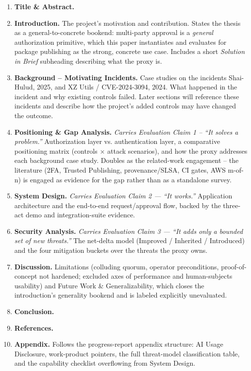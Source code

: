 \documentclass[12pt]{article}
\begin{document}
\begin{enumerate}[leftmargin=1.5em, itemsep=3pt]
  \item \textbf{Title \& Abstract.}
  \item \textbf{Introduction.} The project's motivation and contribution. States the thesis as a general-to-concrete bookend: multi-party approval is a \emph{general} authorization primitive, which this paper instantiates and evaluates for package publishing as the strong, concrete use case. Includes a short \emph{Solution in Brief} subheading describing what the proxy is.
  \item \textbf{Background -- Motivating Incidents.} Case studies on the incidents Shai-Hulud, 2025, and XZ Utils / CVE-2024-3094, 2024. What happened in the incident and why existing controls failed. Later sections will reference these incidents and describe how the project's added controls may have changed the outcome.
  \item \textbf{Positioning \& Gap Analysis.} \emph{Carries Evaluation Claim 1 -- ``It solves a problem.''} Authorization layer vs. authentication layer, a comparative positioning matrix (controls $\times$ attack scenarios), and how the proxy addresses each background case study. Doubles as the related-work engagement -- the literature (2FA, Trusted Publishing, provenance/SLSA, CI gates, AWS m-of-n) is engaged as evidence for the gap rather than as a standalone survey.
  \item \textbf{System Design.} \emph{Carries Evaluation Claim 2 — ``It works.''} Application architecture and the end-to-end request/approval flow, backed by the three-act demo and integration-suite evidence.
  \item \textbf{Security Analysis.} \emph{Carries Evaluation Claim 3 — ``It adds only a bounded set of new threats.''} The net-delta model (Improved / Inherited / Introduced) and the four mitigation buckets over the threats the proxy owns.
  \item \textbf{Discussion.} Limitations (colluding quorum, operator preconditions, proof-of-concept not hardened; excluded axes of performance and human-subjects usability) and Future Work \& Generalizability, which closes the introduction's generality bookend and is labeled explicitly unevaluated.
  \item \textbf{Conclusion.}
  \item \textbf{References.}
  \item \textbf{Appendix.} Follows the progress-report appendix structure: AI Usage Disclosure, work-product pointers, the full threat-model classification table, and the capability checklist overflowing from System Design.
\end{enumerate}
\end{document}
